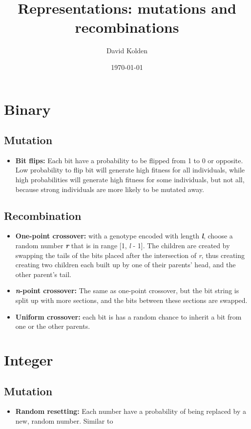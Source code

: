 \documentclass{article}
\date{\today}
\author{David Kolden}
\title{Representations: mutations and recombinations}
\begin{document}
   \maketitle
   \tableofcontents
   \section{Binary}
   \subsection{Mutation}
   \begin{itemize}
   \item \textbf{Bit flips:} Each bit have a probability to be flipped from 1 to 0 or opposite. Low probability to flip bit will generate high fitness for all individuals, while high probabilities will generate high fitness for some individuals, but not all, because strong individuals are more likely to be mutated away.
   \end{itemize}
   \subsection{Recombination}
   \begin{itemize}
   \item \textbf{One-point crossover:} with a genotype encoded with length \textbf{\emph{l}}, choose a random number \textbf{\emph{r}} that is in range [1, \emph{l} - 1]. The children are created by swapping the tails of the bits placed after the intersection of \emph{r}, thus creating creating two children each built up by one of their parents' head, and the other parent's tail.
   \item \textbf{\textit{n}-point crossover:} The same as one-point crossover, but the bit string is split up with more sections, and the bits between these sections are swapped.
   \item \textbf{Uniform crossover:} each bit is has a random chance to inherit a bit from one or the other parents.
   \end{itemize}
   \section{Integer}
   \subsection{Mutation}
   \begin{itemize}
   \item \textbf{Random resetting:} Each number have a probability of being replaced by a new, random number. Similar to 
   \end{itemize}
\end{document}
